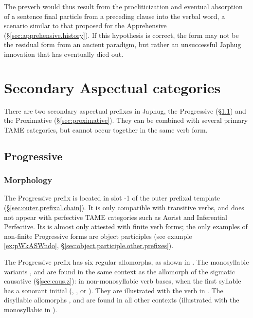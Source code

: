 The preverb  would thus result from the procliticization and eventual absorption of a sentence final particle from a preceding clause into the verbal word, a scenario similar to that proposed for the Apprehensive  (§\ref{sec:apprehensive.history}). If this hypothesis is correct, the form  may not be the residual form from an ancient paradigm, but rather an unsuccessful Japhug innovation that has eventually died out.

  \section{Secondary Aspectual categories} \label{sec:second.aspect}
There are two secondary aspectual prefixes in Japhug, the Progressive (§\ref{sec:progressive}) and the Proximative (§\ref{sec:proximative}). They can be combined with several primary TAME categories, but cannot occur together in the same verb form. 

\subsection{Progressive} \label{sec:progressive}

\subsubsection{Morphology} \label{sec:progressive.morphology}
The Progressive prefix  is located in slot -1 of the outer prefixal template (§\ref{sec:outer.prefixal.chain}). It is only compatible with transitive verbs, and does not appear with perfective TAME categories such as Aorist and Inferential Perfective. Its is almost only attested with finite verb forms; the only examples of non-finite Progressive forms are object participles (see example \ref{ex:pWkASWndo}, §\ref{sec:object.participle.other.prefixes}).

The Progressive prefix has six regular allomorphs, as shown in . The monosyllabic variants ,  and  are found in the same context as the  allomorph of the sigmatic causative (§\ref{sec:caus.z}): in non-monosyllabic verb bases, when the first syllable has a sonorant initial (, ,  or ). They are illustrated with the verb  in . The disyllabic allomorphs ,  and  are found in all other contexts (illustrated with the monosyllabic  in ).


